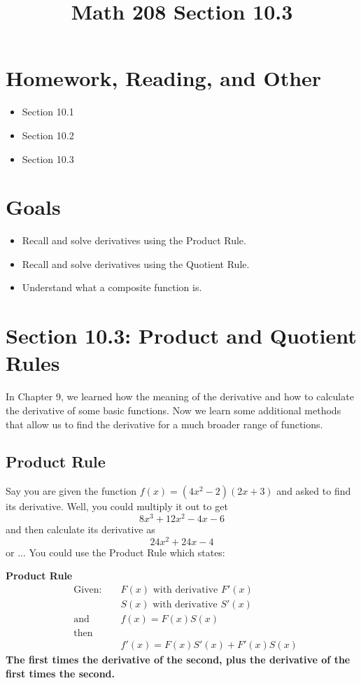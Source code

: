 \documentclass[14pt]{extarticle}
\title{\vspace{-5ex}Math 208 Section 10.3}
\date{\vspace{-10ex}}
\begin{document}
	\maketitle		
	\section*{Homework, Reading, and Other}
	\begin{itemize}
		\item Section 10.1
		\item Section 10.2
		\item Section 10.3
	\end{itemize}

\section{Goals}
\begin{itemize}
	\item Recall and solve derivatives using the Product Rule.
	\item Recall and solve derivatives using the Quotient Rule.
	\item Understand what a composite function is.
\end{itemize}

\section{Section 10.3: Product and Quotient Rules}
In Chapter 9, we learned how the meaning of the derivative and how to calculate the derivative of some basic functions. Now we learn some additional methods that allow us to find the derivative for a much broader range of functions.

\subsection*{Product Rule}

Say you are given the function $f(x) = (4x^2 -2)(2x+3)$ and asked to find its derivative. Well, you could multiply it out to get $$8x^{3} + 12x^2 - 4x - 6$$
and then calculate its derivative as $$24x^{2}+ 24x - 4$$ or ... You could use the Product Rule which states: 

\begin{tcolorbox}[enhanced jigsaw,colback=bg,boxrule=0pt,arc=0pt]
	\textbf{Product Rule}
	\begin{align*}
		&\text{Given: } & &F(x) \text{ with derivative } F'(x) \\
		& & &S(x) \text{ with derivative } S'(x) \\
		&\text{and } & &f(x) = F(x)S(x) \\
		&\text{then }\\
		& & &f'(x) = F(x)S'(x) + F'(x)S(x)
	\end{align*}
\textbf{The first times the derivative of the second, plus the derivative of the first times the second.}
\end{tcolorbox}
\end{document}
